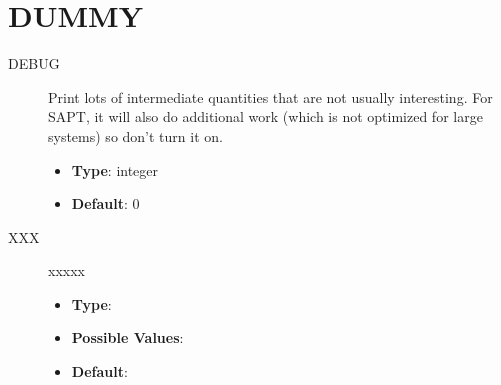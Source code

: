 \documentclass[letterpaper,10pt,english]{sphinxmanual}
\begin{document}
\section{DUMMY}
\label{index:dummy}\begin{description}
\item[{DEBUG}] \leavevmode{}\label{index:term-41}
Print lots of intermediate quantities that are not usually interesting.
For SAPT, it will also do additional work (which is not optimized for
large systems) so don't turn it on.
\begin{itemize}
\item {} 
\textbf{Type}: integer

\item {} 
\textbf{Default}: 0

\end{itemize}

\end{description}
\begin{description}
\item[{XXX}] \leavevmode{}\label{index:term-42}
xxxxx
\begin{itemize}
\item {} 
\textbf{Type}:

\item {} 
\textbf{Possible Values}:

\item {} 
\textbf{Default}:

\end{itemize}

\end{description}
\end{document}
